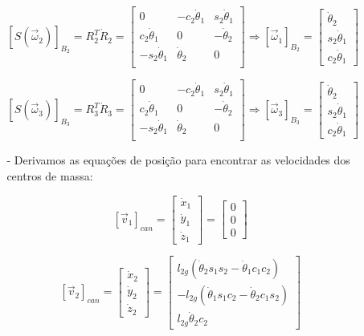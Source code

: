 \documentclass[12pt,a4paper]{article}
\begin{document}
\begin{itemize}
\begin{itemize}
\begin{itemize}
$$ [S(\vec{\omega}_2)]_{B_2} = R_2^T \dot{R}_2 =
\begin{bmatrix}
0 & -c_2 \dot{\theta}_1 & s_2 \dot{\theta}_1 \\
c_2 \dot{\theta}_1 & 0 & -\dot{\theta}_2 \\
-s_2 \dot{\theta}_1 & \dot{\theta}_2 & 0 \\
\end{bmatrix}
\Rightarrow
[\vec{\omega}_1]_{B_2} =
\begin{bmatrix}
\dot{\theta}_2 \\
s_2 \dot{\theta}_1 \\
c_2 \dot{\theta}_1
\end{bmatrix}
$$

$$ [S(\vec{\omega}_3)]_{B_3} = R_3^T \dot{R}_3 =
\begin{bmatrix}
0 & -c_2 \dot{\theta}_1 & s_2 \dot{\theta}_1 \\
c_2 \dot{\theta}_1 & 0 & -\dot{\theta}_2 \\
-s_2 \dot{\theta}_1 & \dot{\theta}_2 & 0 \\
\end{bmatrix}
\Rightarrow
[\vec{\omega}_3]_{B_3} =
\begin{bmatrix}
\dot{\theta}_2 \\
s_2 \dot{\theta}_1 \\
c_2 \dot{\theta}_1
\end{bmatrix}
$$

\item[-] Derivamos as equações de posição para encontrar as velocidades dos centros de massa:

$$
[\vec{v}_1]_{can} =
\begin{bmatrix}
\dot{x}_1 \\
\dot{y}_1 \\
\dot{z}_1
\end{bmatrix}
=
\begin{bmatrix}
0 \\
0 \\
0
\end{bmatrix}
$$

$$
[\vec{v}_2]_{can} =
\begin{bmatrix}
\dot{x}_2 \\
\dot{y}_2 \\
\dot{z}_2
\end{bmatrix}
=
\begin{bmatrix}
l_{2g} ( \dot{\theta}_2 s_1 s_2 - \dot{\theta}_1 c_1 c_2 ) \\
-l_{2g} ( \dot{\theta}_1 s_1 c_2 - \dot{\theta}_2 c_1 s_2 ) \\
l_{2g} \dot{\theta}_2 c_2 
\end{bmatrix}
$$


\end{itemize}
\end{itemize}
\end{itemize}
\end{document}
